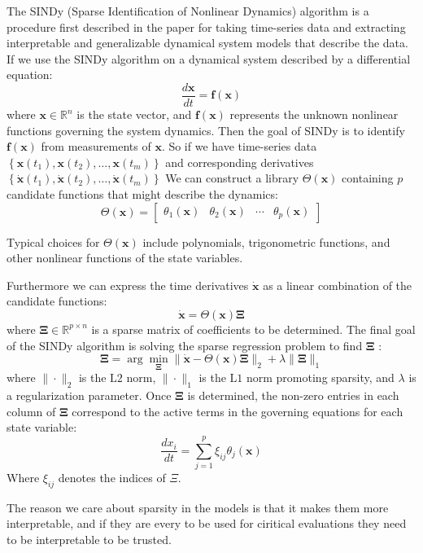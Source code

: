 The SINDy (Sparse Identification of Nonlinear Dynamics) algorithm is a procedure first described in the paper \cite{Brunton_2016} for taking time-series data and extracting interpretable and generalizable dynamical system models that describe the data. If we use the SINDy algorithm on a dynamical system described by a differential equation:
$$
\frac{d \mathbf{x}}{d t}=\mathbf{f}(\mathbf{x})
$$
where $\mathbf{x} \in \mathbb{R}^n$ is the state vector, and $\mathbf{f}(\mathbf{x})$ represents the unknown nonlinear functions governing the system dynamics. Then the goal of SINDy is to identify $\mathbf{f}(\mathbf{x})$ from measurements of $\mathbf{x}$.
So if we have time-series data $\left\{\mathbf{x}\left(t_1\right), \mathbf{x}\left(t_2\right), \ldots, \mathbf{x}\left(t_m\right)\right\}$ and corresponding derivatives $\left\{\dot{\mathbf{x}}\left(t_1\right), \dot{\mathbf{x}}\left(t_2\right), \ldots, \dot{\mathbf{x}}\left(t_m\right)\right\}$ We can construct a library $\Theta(\mathbf{x})$ containing $p$ candidate functions that might describe the dynamics:
$$
\Theta(\mathbf{x})=\left[\begin{array}{llll}
\theta_1(\mathbf{x}) & \theta_2(\mathbf{x}) & \cdots & \theta_p(\mathbf{x})
\end{array}\right]
$$

Typical choices for $\Theta(\mathbf{x})$ include polynomials, trigonometric functions, and other nonlinear functions of the state variables. 

Furthermore we can express the time derivatives $\dot{\mathbf{x}}$ as a linear combination of the candidate functions:
$$
\dot{\mathbf{x}}=\Theta(\mathbf{x}) \boldsymbol{\Xi}
$$
where $\boldsymbol{\Xi} \in \mathbb{R}^{p \times n}$ is a sparse matrix of coefficients to be determined. The final goal of the SINDy algorithm is solving the sparse regression problem to find $\boldsymbol{\Xi}$ :
$$
\boldsymbol{\Xi}=\arg \min _{\boldsymbol{\Xi}}\|\dot{\mathbf{x}}-\Theta(\mathbf{x}) \boldsymbol{\Xi}\|_2+\lambda\|\boldsymbol{\Xi}\|_1
$$
where $\|\cdot\|_2$ is the $\mathrm{L} 2$ norm, $\|\cdot\|_1$ is the $\mathrm{L} 1$ norm promoting sparsity, and $\lambda$ is a regularization parameter. Once $\boldsymbol{\Xi}$ is determined, the non-zero entries in each column of $\boldsymbol{\Xi}$ correspond to the active terms in the governing equations for each state variable:
$$
\frac{d x_i}{d t}=\sum_{j=1}^p \xi_{ij} \theta_j(\mathbf{x})
$$
Where $\xi_{ij}$ denotes the indices of $\Xi$.

The reason we care about sparsity in the models is that it makes them more interpretable, and if they are every to be used for ciritical evaluations they need to be interpretable to be trusted.

